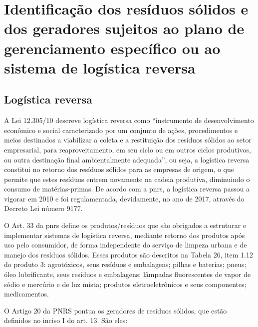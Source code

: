 \newpage
\FloatBarrier
\section{Identificação dos resíduos sólidos e dos geradores sujeitos ao plano de gerenciamento específico ou ao sistema de logística reversa}
\label{sec:rs_geradores_lr}

\subsection{Logística reversa}

A Lei 12.305/10 descreve logística reversa como “instrumento de desenvolvimento econômico e social caracterizado por um conjunto de ações, procedimentos e meios destinados a viabilizar a coleta e a restituição dos resíduos sólidos ao setor empresarial, para reaproveitamento, em seu ciclo ou em outros ciclos produtivos, ou outra destinação final ambientalmente adequada”, ou seja, a logística reversa constitui no retorno dos resíduos sólidos para as empresas de origem, o que permite que estes resíduos entrem novamente na cadeia produtiva, diminuindo o consumo de matérias-primas. De acordo com a \gls{pnrs}, a logística reversa passou a vigorar em 2010 e foi regulamentada, devidamente, no ano de 2017, através do Decreto Lei número 9177.

O Art. 33 da \gls{pnrs} define os produtos/resíduos que são obrigados a estruturar e implementar sistemas de logística reversa, mediante retorno dos produtos após uso pelo consumidor, de forma independente do serviço de limpeza urbana e de manejo dos resíduos sólidos. Esses produtos são descritos na Tabela 26, item 1.12 do produto 3: agrotóxicos, seus resíduos e embalagens; pilhas e baterias; pneus; óleo lubrificante, seus resíduos e embalagens; lâmpadas fluorescentes de vapor de sódio e mercúrio e de luz mista; produtos eletroeletrônicos e seus componentes; medicamentos.

O Artigo 20 da PNRS pontua os geradores de resíduos sólidos, que estão definidos no inciso I do art. 13. São eles: 

